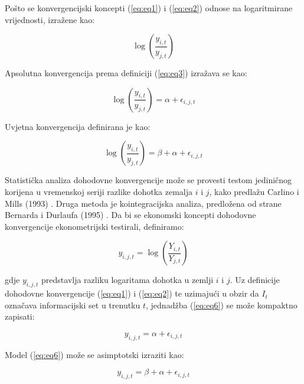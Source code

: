 \documentclass{crebsshr}
\begin{document}
    Pošto se konvergencijski koncepti (\ref{eq:eq1}) i (\ref{eq:eq2}) odnose na logaritmirane vrijednosti, izražene kao:
    
    \begin{equation} \label{eq:eq3}
    \log\left(\frac{y_{i,t}}{y_{j,t}}\right)
    \end{equation}
    
    Apsolutna konvergencija prema definiciji (\ref{eq:eq3}) izražava se kao:
    
    \begin{equation} \label{eq:eq4}
    \log\left(\frac{y_{i,t}}{y_{j,t}}\right) = \alpha + \epsilon_{i,j,t}
    \end{equation}
    
    Uvjetna konvergencija definirana je kao:
    
    \begin{equation} \label{eq:eq5}
    \log\left(\frac{y_{i,t}}{y_{j,t}}\right) = \beta + \alpha + \epsilon_{i,j,t}
    \end{equation}
    
    Statistička analiza dohodovne konvergencije može se provesti testom jediničnog korijena u vremenskoj seriji razlike dohotka zemalja \( i \) i \( j \), kako predlažu Carlino i Mills (1993) \citep{Carlin1993}. Druga metoda je kointegracijska analiza, predložena od strane Bernarda i Durlaufa (1995) \citep{Bernard1995}. Da bi se ekonomski koncepti dohodovne konvergencije ekonometrijski testirali, definiramo:
    
    \begin{equation} \label{eq:eq6}
    y_{i,j,t} = \log\left(\frac{Y_{i,t}}{Y_{j,t}}\right)
    \end{equation}
    
    gdje \( y_{i,j,t} \) predstavlja razliku logaritama dohotka u zemlji \( i \) i \( j \). Uz definicije dohodovne konvergencije (\ref{eq:eq1}) i (\ref{eq:eq2}) te uzimajući u obzir da \( I_t \) označava informacijski set u trenutku \( t \), jednadžba (\ref{eq:eq6}) se može kompaktno zapisati:
    
    \begin{equation} \label{eq:eq7}
    y_{i,j,t} = \alpha + \epsilon_{i,j,t}
    \end{equation}
    
    Model (\ref{eq:eq6}) može se asimptotski izraziti kao:
    
    \begin{equation} \label{eq:eq8}
    y_{i,j,t} = \beta + \alpha + \epsilon_{i,j,t}
    \end{equation}
    
\end{document}
